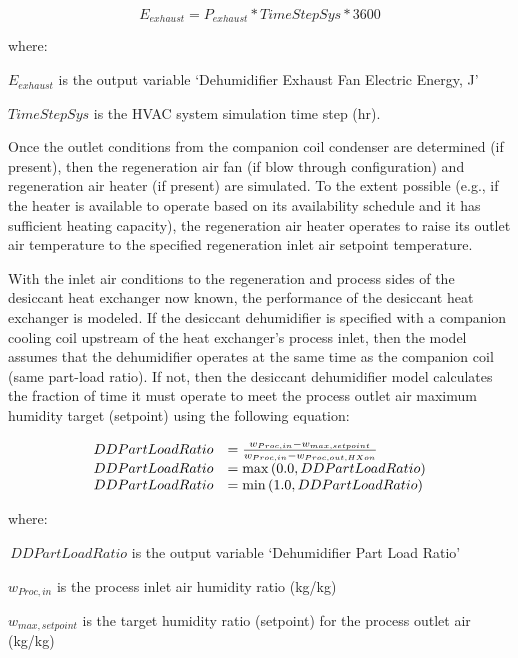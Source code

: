 \begin{equation}
{E_{exhaust}} = {P_{exhaust}}*TimeStepSys*3600
\end{equation}

where:

\({E_{exhaust}}\) is the output variable `Dehumidifier Exhaust Fan Electric Energy, J'

\(TimeStepSys\) is the HVAC system simulation time step (hr).

Once the outlet conditions from the companion coil condenser are determined (if present), then the regeneration air fan (if blow through configuration) and regeneration air heater (if present) are simulated. To the extent possible (e.g., if the heater is available to operate based on its availability schedule and it has sufficient heating capacity), the regeneration air heater operates to raise its outlet air temperature to the specified regeneration inlet air setpoint temperature.

With the inlet air conditions to the regeneration and process sides of the desiccant heat exchanger now known, the performance of the desiccant heat exchanger is modeled. If the desiccant dehumidifier is specified with a companion cooling coil upstream of the heat exchanger's process inlet, then the model assumes that the dehumidifier operates at the same time as the companion coil (same part-load ratio). If not, then the desiccant dehumidifier model calculates the fraction of time it must operate to meet the process outlet air maximum humidity target (setpoint) using the following equation:

\begin{equation}
  \begin{array}{rl}
    DDPartLoadRatio &= \frac{w_{Proc,in} - w_{max,setpoint}}{w_{Proc,in} - w_{Proc,out,HXon}} \\
    DDPartLoadRatio &= \max\left(0.0,DDPartLoadRatio\right) \\
    DDPartLoadRatio &= \min\left(1.0,DDPartLoadRatio\right)
  \end{array}
\end{equation}

where:

\(\,DDPartLoadRatio\) is the output variable `Dehumidifier Part Load Ratio'

\({w_{Proc,in}}\) is the process inlet air humidity ratio (kg/kg)

\({w_{max,setpoint}}\) is the target humidity ratio (setpoint) for the process outlet air (kg/kg)

